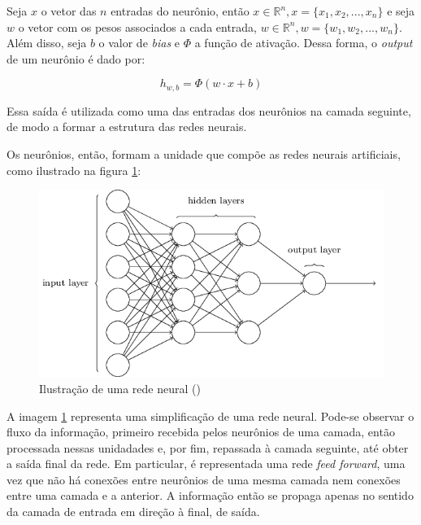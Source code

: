 

Seja $x$ o vetor das $n$ entradas do neurônio, então
$x \in \mathbb{R}^n, x=\{x_1, x_2, ..., x_n\}$ e seja 
$w$ o vetor com os pesos associados a cada entrada, 
$w \in \mathbb{R}^n, w=\{w_1, w_2, ..., w_n\}$. Além disso,
seja $b$ o valor de \textit{bias} e $\Phi$ a função de ativação.
Dessa forma, o \textit{output} de um neurônio é dado por:
 
\begin{equation}
  h_{w,b} = \Phi(w \cdot x + b)
\end{equation}

Essa saída é utilizada como uma das entradas dos neurônios
na camada seguinte, de modo a formar a estrutura das redes 
neurais. 

Os neurônios,
então, formam a unidade que compõe as redes neurais artificiais,
como ilustrado na figura \ref{fig:redeneural}:

\begin{figure}[H] 
  \includegraphics[width= 12cm]{../figuras/redes/rede_mlp.png}
  \caption{Ilustração de uma rede neural (\cite{neuralnetworksanddeeplearning})}
  \label{fig:redeneural}
\end{figure}

A imagem \ref{fig:redeneural} representa uma simplificação de uma 
rede neural. Pode-se observar o fluxo da informação, primeiro recebida pelos 
neurônios de uma camada, então processada nessas unidadades e, por fim, repassada à camada 
seguinte, até obter a saída final da rede. Em particular, é representada uma
rede \textit{feed forward}, uma vez que não há conexões entre neurônios de uma 
mesma camada nem conexões entre uma camada e a anterior. A informação então 
se propaga apenas no sentido da camada de entrada em direção à final, de saída.


